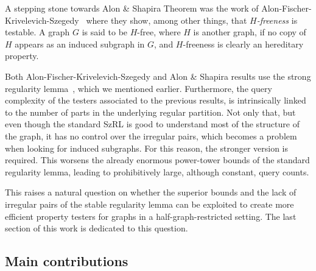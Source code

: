         A stepping stone towards Alon \& Shapira Theorem was the work of
        Alon-Fischer-Krivelevich-Szegedy~\cite{efficient_testing_of_large_graphs} where they show, among other things,
        that \emph{$H$-freeness} is testable.
        A graph $G$ is said to be $H$-free, where $H$ is another graph, if no copy of $H$ appears as an induced subgraph in
        $G$, and $H$-freeness is clearly an hereditary property.

        Both Alon-Fischer-Krivelevich-Szegedy and Alon \& Shapira results use the strong regularity
        lemma~\cite[Lemma 4.1]{efficient_testing_of_large_graphs}, which we mentioned earlier.
        Furthermore, the query complexity of the testers associated to the previous results, is intrinsically linked to the number of
        parts in the underlying regular partition.
        Not only that, but even though the standard SzRL is good to understand most of the structure of the graph,
        it has no control over the irregular pairs, which becomes a problem when looking for induced subgraphs.
        For this reason, the stronger version is required.
        This worsens the already enormous power-tower bounds of the standard regularity lemma, leading to prohibitively large,
        although constant, query counts.

        This raises a natural question on whether the superior bounds and the lack of irregular pairs of the stable regularity
        lemma can be exploited to create more efficient property testers for graphs in a half-graph-restricted setting.
        The last section of this work is dedicated to this question.

    \subsection{Main contributions} \label{subsec:main_contributions}

